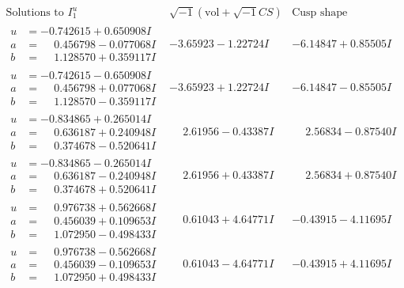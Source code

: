 \documentclass[1p]{elsarticle_modified}
\theoremstyle{definition}
\newcommand{\I}{\sqrt{-1}}
\begin{document}
$$\begin{array}{c|c|c}  
\text{Solutions to }I^u_{1}& \I (\text{vol} + \sqrt{-1}CS) & \text{Cusp shape}\\
 \hline 
\begin{aligned}
u &= -0.742615 + 0.650908 I \\
a &= \phantom{-}0.456798 - 0.077068 I \\
b &= \phantom{-}1.128570 + 0.359117 I\end{aligned}
 & -3.65923 - 1.22724 I & -6.14847 + 0.85505 I \\ \hline\begin{aligned}
u &= -0.742615 - 0.650908 I \\
a &= \phantom{-}0.456798 + 0.077068 I \\
b &= \phantom{-}1.128570 - 0.359117 I\end{aligned}
 & -3.65923 + 1.22724 I & -6.14847 - 0.85505 I \\ \hline\begin{aligned}
u &= -0.834865 + 0.265014 I \\
a &= \phantom{-}0.636187 + 0.240948 I \\
b &= \phantom{-}0.374678 - 0.520641 I\end{aligned}
 & \phantom{-}2.61956 - 0.43387 I & \phantom{-}2.56834 - 0.87540 I \\ \hline\begin{aligned}
u &= -0.834865 - 0.265014 I \\
a &= \phantom{-}0.636187 - 0.240948 I \\
b &= \phantom{-}0.374678 + 0.520641 I\end{aligned}
 & \phantom{-}2.61956 + 0.43387 I & \phantom{-}2.56834 + 0.87540 I \\ \hline\begin{aligned}
u &= \phantom{-}0.976738 + 0.562668 I \\
a &= \phantom{-}0.456039 + 0.109653 I \\
b &= \phantom{-}1.072950 - 0.498433 I\end{aligned}
 & \phantom{-}0.61043 + 4.64771 I & -0.43915 - 4.11695 I \\ \hline\begin{aligned}
u &= \phantom{-}0.976738 - 0.562668 I \\
a &= \phantom{-}0.456039 - 0.109653 I \\
b &= \phantom{-}1.072950 + 0.498433 I\end{aligned}
 & \phantom{-}0.61043 - 4.64771 I & -0.43915 + 4.11695 I \\ \hline\begin{aligned}

\end{aligned}
\end{array}$$
\end{document}
